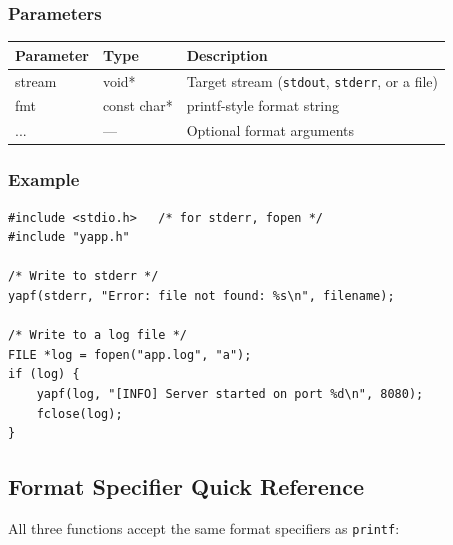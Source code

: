 \documentclass[11pt, a4paper]{article}
\begin{document}
\subsubsection*{Parameters}

\begin{center}
\begin{tabular}{>{\ttfamily}l >{\ttfamily}l l}
\toprule
\normalfont\textbf{Parameter} & \normalfont\textbf{Type} & \textbf{Description} \\
\midrule
stream & void*       & Target stream (\texttt{stdout}, \texttt{stderr}, or a file) \\
fmt    & const char* & printf-style format string \\
...    & —           & Optional format arguments \\
\bottomrule
\end{tabular}
\end{center}

\subsubsection*{Example}

\begin{tcolorbox}[codebox]
\begin{lstlisting}
#include <stdio.h>   /* for stderr, fopen */
#include "yapp.h"

/* Write to stderr */
yapf(stderr, "Error: file not found: %s\n", filename);

/* Write to a log file */
FILE *log = fopen("app.log", "a");
if (log) {
    yapf(log, "[INFO] Server started on port %d\n", 8080);
    fclose(log);
}
\end{lstlisting}
\end{tcolorbox}

\subsection{Format Specifier Quick Reference}

All three functions accept the same format specifiers as \texttt{printf}:
\end{document}
